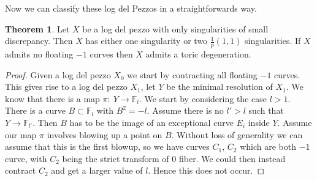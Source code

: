 \documentclass[11pt]{report}
\theoremstyle{definition}
\newtheorem{thm}{Theorem}[section]
\theoremstyle{definition}
\theoremstyle{definition}
\theoremstyle{definition}
\theoremstyle{definition}
\theoremstyle{definition}
\theoremstyle{definition}
\theoremstyle{definition}
\newcommand{\ldp}{log del pezzo }
\newcommand{\mb}[1]{\mathbb{#1}}
\begin{document}
Now we can classify these log del Pezzos in a straightforwards way. 
\begin{thm}
Let $X$ be a \ldp with only singularities of small discrepancy. Then $X$ has either one singularity or two $\frac{1}{p}(1,1)$ singularities. If $X$ admits no floating $-1$ curves then $X$ admits a toric degeneration.
\end{thm}
\begin{proof}
Given a \ldp $X_0$ we start by contracting all floating $-1$ curves. This gives rise to a \ldp $X_1$, let $Y$ be the minimal resolution of $X_1$. We know that there is a map $\pi : \: Y \rightarrow \mathbb{F}_l$. We start by considering the case $l > 1$. There is a curve $B \subset \mathbb{F}_l$ with $B^2 = -l$. Assume there is no  $l' >l$ such that $Y \rightarrow \mb{F}_{l'}$. Then $B$ has to be the image of an exceptional curve $E_i$ inside $Y$. Assume our map $\pi$ involves blowing up a point on $B$. Without loss of generality we can assume that this is the first blowup, so we have curves $C_1, \, C_2$ which are both $-1$ curve, with $C_2$ being the strict transform of $0$ fiber. We could then instead contract $C_2$ and get a larger value of $l$. Hence this does not occur. 


\end{proof}
\end{document}
